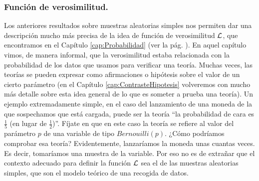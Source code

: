 \subsubsection{Función de verosimilitud.}
\label{cap06:subsubsec:FuncionVerosimilitud}

Los anteriores resultados sobre muestras aleatorias simples nos permiten dar una descripción mucho más precisa de la idea de función de verosimilitud $\cal L$, que encontramos en el Capítulo \ref{cap:Probabilidad} (ver la pág. \pageref{cap03:subsubsec:verosimilitud}). En aquel capítulo vimos, de manera informal, que la verosimilitud estaba relacionada con la probabilidad de los datos que usamos para verificar una teoría. Muchas veces, las teorías se pueden expresar como afirmaciones o hipótesis sobre el valor de un cierto parámetro (en el Capítulo \ref{cap:ContrasteHipotesis} volveremos con mucho más detalle sobre esta idea general de lo que es someter a prueba una teoría). Un ejemplo extremadamente simple, en el caso del lanzamiento de una moneda de la que sospechamos que está cargada,  puede ser la teoría ``la probabilidad de cara es $\frac{1}{5}$ (en lugar de $\frac{1}{2}$)''. Fíjate en que en este caso la teoría se refiere al valor del parámetro $p$ de una variable de tipo $Bernouilli(p)$. ¿Cómo podríamos comprobar esa teoría? Evidentemente, lanzaríamos la moneda unas cuantas veces. Es decir, tomaríamos una muestra de la variable. Por eso no es de extrañar que el contexto adecuado para definir la función $\cal L$ sea el de las muestras aleatorias simples, que son el modelo teórico de una recogida de datos.
    \begin{center}
    \end{center}
